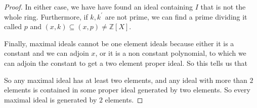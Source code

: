 \documentclass{article}
\begin{document}
\begin{itemize}
\begin{proof}
                In either case, we have have found an ideal containing $I$ that is not the whole ring. Furthermore, if $k, k^{\prime}$ are not prime, we can find a prime dividing it called $p$ and $(x, k) \subseteq (x, p) \neq \mathbb{Z}[X]$. 

                Finally, maximal ideals cannot be one element ideals because either it is a constant and we can adjoin $x$, or it is a non constant polynomial, to which we can adjoin the constant to get a two element proper ideal. So this tells us that 

                So any maximal ideal has at least two elements, and any ideal with more than $2$ elements is contained in some proper ideal generated by two elements. So every maximal ideal is generated by $2$ elements.
            \end{proof}
    \end{itemize}
\end{document}
